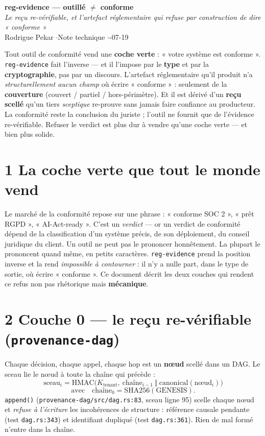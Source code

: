 \documentclass[11pt]{article}
\begin{document}
\begin{center}
{\LARGE\bfseries\color{efenavy} reg-evidence — outillé $\neq$ conforme}\\[3pt]
{\large\color{efegray}\itshape Le reçu re-vérifiable, et l'artefact réglementaire qui refuse
par construction de dire « conforme »}\\[5pt]
{\color{efegray}Rodrigue Pekar \quad$\cdot$\quad Note technique \quad$\cdot$-07-19}
\end{center}
\vspace{2pt}

\begin{these}
Tout outil de conformité vend une \textbf{coche verte} : « votre système est conforme ».
\texttt{reg-evidence} fait l'inverse — et il l'impose par le \textbf{type} et par la
\textbf{cryptographie}, pas par un discours. L'artefact réglementaire qu'il produit n'a
\emph{structurellement aucun champ} où écrire « conforme » : seulement de la \textbf{couverture}
(couvert / partiel / hors-périmètre). Et il est dérivé d'un \textbf{reçu scellé} qu'un tiers
\emph{sceptique} re-prouve sans jamais faire confiance au producteur. La conformité reste la
conclusion du juriste ; l'outil ne fournit que de l'évidence re-vérifiable. Refuser le verdict
est plus dur à vendre qu'une coche verte — et bien plus solide.
\end{these}

\section{1 \;\textbar\; La coche verte que tout le monde vend}
Le marché de la conformité repose sur une phrase : « conforme SOC 2 », « prêt RGPD »,
« AI-Act-ready ». C'est un \emph{verdict} — or un verdict de conformité dépend de la
classification d'un système précis, de son déploiement, du conseil juridique du client. Un
outil ne peut pas le prononcer honnêtement. La plupart le prononcent quand même, en petits
caractères. \texttt{reg-evidence} prend la position inverse et la rend \emph{impossible à
contourner} : il n'y a nulle part, dans le type de sortie, où écrire « conforme ». Ce document
décrit les deux couches qui rendent ce refus non pas rhétorique mais \textbf{mécanique}.

\section{2 \;\textbar\; Couche 0 — le reçu re-vérifiable (\texttt{provenance-dag})}
Chaque décision, chaque appel, chaque hop est un \textbf{nœud} scellé dans un DAG. Le sceau
lie le nœud à toute la chaîne qui précède :
\[
\text{sceau}_i = \mathrm{HMAC}\big(K_{\text{tenant}},\ \text{chaîne}_{i-1}\ \Vert\ \mathrm{canonical}(\text{n\oe ud}_i)\big)
\]
\vspace{-6pt}
\[
\text{avec}\quad \text{chaîne}_0 = \mathrm{SHA256}(\text{GENESIS}).
\]
\texttt{append()} (\texttt{provenance-dag/src/dag.rs:83}, sceau ligne 95) scelle chaque nœud et
\emph{refuse à l'écriture} les incohérences de structure : référence causale pendante
(test \texttt{dag.rs:343}) et identifiant dupliqué (test \texttt{dag.rs:361}). Rien de mal formé
n'entre dans la chaîne.
\end{document}
